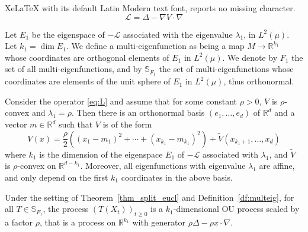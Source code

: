 \documentclass[10pt,a4paper]{amsart}
\begin{document}
XeLaTeX with its default Latin Modern text font, reports no missing character.
\begin{equation}\label{eq:L}
\mathcal{L} = \Delta - \nabla V \cdot \nabla
\end{equation}

\begin{definition}\label{df:multeig}
  Let $E_1$ be the eigenspace of $-\mathcal{L}$ associated with the eigenvalue
  $\lambda_1$, in $L^2(\mu)$. Let $k_1 = \dim{E_1}$. We define a
  multi-eigenfunction as being a map $M \to\mathbb{R}^{k_1}$ whose coordinates are
  orthogonal elements of $E_1$ in $L^2(\mu)$. We denote by $F_1$ the set of
  all multi-eigenfunctions, and by $\mathbb{S}_{F_1}$ the set of multi-eigenfunctions
  whose coordinates are elements of the unit sphere of $E_1$ in $L^2(\mu)$,
  thus orthonormal.
\end{definition}

\begin{theorem} \label{thm_split_eucl} Consider the operator \eqref{eq:L} and assume
  that for some constant $\rho>0$, $V$ is $\rho$-convex and
  $\lambda_1 = \rho$. Then there is an orthonormal basis $(e_1,\ldots,e_d)$ of
  $\mathbb{R}^d$ and a vector $m \in \mathbb{R}^d$ such that $V$ is of the form
    \begin{equation}
    V(x) = \frac{\rho}{2}((x_1-m_1)^2 + \cdots + (x_{k_1}-m_{k_1})^2) + \widetilde{V}(x_{k_1+1},\ldots,x_d)
  \end{equation}
  where $k_1$ is the dimension of the eigenspace $E_1$ of $-\mathcal{L}$
  associated with $\lambda_1$, and $\widetilde{V}$ is $\rho$-convex on
  $\mathbb{R}^{d-k_1}$. Moreover, all eigenfunctions with eigenvalue
  $\lambda_1$ are affine, and only depend on the first $k_1$ coordinates in
  the above basis.
\end{theorem}

\begin{lemma} \label{lem_proj_ou}
  Under the setting of Theorem~\ref{thm_split_eucl} and
  Definition~\ref{df:multeig}, for all $T \in \mathbb{S}_{F_1}$, the process
  ${(T(X_t))}_{t\geq0}$ is a $k_1$-dimensional OU process scaled by a factor
  $\rho$, that is a process on $\mathbb{R}^{k_1}$ with generator
  $\rho \Delta - \rho x \cdot \nabla$.
\end{lemma}
\end{document}
